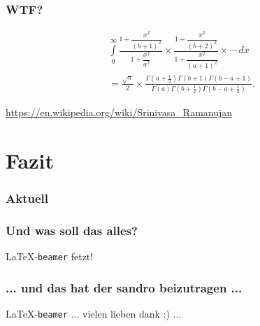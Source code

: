 \documentclass{beamer}
\begin{document}
\begin{frame}
  \frametitle{WTF?}

  \onslide<+->

  \begin{multline*}
    \int \limits _{0}^{\infty }{\frac {1+{\dfrac {x^{2}}{(b+1)^{2}}}}{1+{\dfrac
          {x^{2}}{a^{2}}}}}\times {\frac {1+{\dfrac
          {x^{2}}{(b+2)^{2}}}}{1+{\dfrac {x^{2}}{(a+1)^{2}}}}}\times \cdots \,dx \\
    = {\frac {\sqrt {\pi }}{2}}\times {\frac {\Gamma \left(a+{\frac
            {1}{2}}\right)\Gamma (b+1)\Gamma (b-a+1)}{\Gamma (a)\Gamma
        \left(b+{\frac {1}{2}}\right)\Gamma \left(b-a+{\frac {1}{2}}\right)}}.
  \end{multline*}

  \bigskip

  {\tiny \url{https://en.wikipedia.org/wiki/Srinivasa_Ramanujan}}

\end{frame}

\section{Fazit}

\begin{frame}
  \frametitle{Aktuell}
  \tableofcontents[currentsection]{}
\end{frame}

\begin{frame}
  \frametitle{Und was soll das alles?}

  \begin{center}
    \LaTeX{}-\texttt{beamer} fetzt!
  \end{center}

\end{frame}

\begin{frame}
  \frametitle{... und das hat der sandro beizutragen ...}

  \begin{center}
    \LaTeX{}-\texttt{beamer} ... vielen lieben dank :) ...
  \end{center}

\end{frame}
\end{document}
